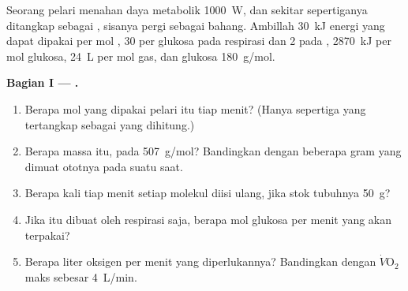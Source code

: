 \begin{problem}
\label{pb:g12:respiration-fermentation:1}
Seorang pelari menahan daya metabolik \qty{1000}{W}, dan sekitar
sepertiganya ditangkap sebagai , sisanya pergi sebagai bahang.
Ambillah \qty{30}{kJ} energi yang dapat dipakai per mol , 30  per
glukosa pada respirasi dan 2 pada , \qty{2870}{kJ} per mol
glukosa, \qty{24}{L} per mol gas, dan glukosa \qty{180}{g/mol}.

\medskip
\noindent\textbf{Bagian I --- .}
\begin{enumerate}
  \item Berapa mol  yang dipakai pelari itu tiap menit?
        (Hanya sepertiga yang tertangkap sebagai  yang dihitung.)
  \item Berapa massa  itu, pada \qty{507}{g/mol}? Bandingkan dengan
        beberapa gram yang dimuat ototnya pada suatu saat.
  \item Berapa kali tiap menit setiap molekul  diisi ulang, jika
        stok tubuhnya \qty{50}{g}?
  \item Jika  itu dibuat oleh respirasi saja, berapa mol glukosa
        per menit yang akan terpakai?
  \item Berapa liter oksigen per menit yang diperlukannya? Bandingkan
        dengan $\dot V\!\mathrm{O_2}$maks sebesar \qty{4}{L/min}.
\end{enumerate}


\end{problem}
